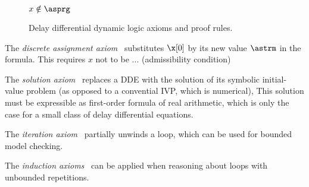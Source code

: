 \begin{figure}[t]
\begin{calculuscollections}{\textwidth}
\begin{calculus}
{{                    
                }{
                }
            }{$x\notin\asprg$}
        \end{calculus}
        \qquad
        \begin{calculus}
        \end{calculus}
        \end{calculuscollections}
        \caption{Delay differential dynamic logic axioms and proof rules.}
        \label{fig:axioms}
    \end{figure}


    The \emph{discrete assignment axiom}~ substitutes $\x[0]$ by its new value $\astrm$ in the formula.
    This requires $x$ not to be ... (admissibility condition)

    The \emph{solution axiom}~ replaces a DDE with the solution of its symbolic initial-value problem (as opposed to a convential IVP, which is numerical), This solution must be expressible as first-order formula of real arithmetic, which is only the case for a small class of delay differential equations.

    The \emph{iteration axiom}~ partially unwinds a loop, which can be used for bounded model checking.

    The \emph{induction axioms}~
    can be applied when reasoning about loops with unbounded repetitions. 

